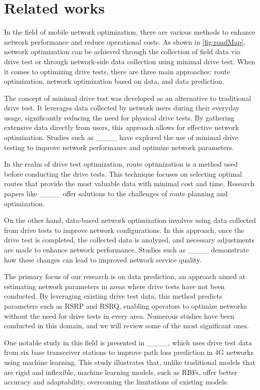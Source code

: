 \section{Related works}
\label{sec:RelatedWorks}
In the field of mobile network optimization, there are various methods to enhance network performance and reduce operational costs. As shown in \autoref{fig:roadMap}, network optimization can be achieved through the collection of field data via drive test or through network-side data collection using minimal drive test. When it comes to optimizing drive tests, there are three main approaches: route optimization, network optimization based on data, and data prediction.

The concept of minimal drive test was developed as an alternative to traditional drive test. It leverages data collected by network users during their everyday usage, significantly reducing the need for physical drive tests. By gathering extensive data directly from users, this approach allows for effective network optimization. Studies such as ____ have explored the use of minimal drive testing to improve network performance and optimize network parameters.

In the realm of drive test optimization, route optimization is a method used before conducting the drive tests. This technique focuses on selecting optimal routes that provide the most valuable data with minimal cost and time. Research papers like ____ offer solutions to the challenges of route planning and optimization.

On the other hand, data-based network optimization involves using data collected from drive tests to improve network configurations. In this approach, once the drive test is completed, the collected data is analyzed, and necessary adjustments are made to enhance network performance. Studies such as ____ demonstrate how these changes can lead to improved network service quality.

The primary focus of our research is on data prediction, an approach aimed at estimating network parameters in areas where drive tests have not been conducted. By leveraging existing drive test data, this method predicts parameters such as \gls{RSRP} and \gls{RSRQ}, enabling operators to optimize networks without the need for drive tests in every area. Numerous studies have been conducted in this domain, and we will review some of the most significant ones.

One notable study in this field is presented in ____, which uses drive test data from six base transceiver stations to improve path loss prediction in 4G networks using machine learning. This study illustrates that, unlike traditional models that are rigid and inflexible, machine learning models, such as \glspl{RBF}, offer better accuracy and adaptability, overcoming the limitations of existing models.

